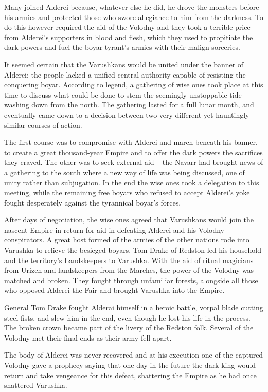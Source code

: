 Many joined Alderei because, whatever else he did, he drove the monsters before his armies and protected those who swore allegiance to him from the darkness. To do this however required the aid of the Volodny and they took a terrible price from Alderei’s supporters in blood and flesh, which they used to propitiate the dark powers and fuel the boyar tyrant's armies with their malign sorceries.

It seemed certain that the Varushkans would be united under the banner of Alderei; the people lacked a unified central authority capable of resisting the conquering boyar. According to legend, a gathering of wise ones took place at this time to discuss what could be done to stem the seemingly unstoppable tide washing down from the north. The gathering lasted for a full lunar month, and eventually came down to a decision between two very different yet hauntingly similar courses of action.

The first course was to compromise with Alderei and march beneath his banner, to create a great thousand-year Empire and to offer the dark powers the sacrifices they craved. The other was to seek external aid – the Navarr had brought news of a gathering to the south where a new way of life was being discussed, one of unity rather than subjugation. In the end the wise ones took a delegation to this meeting, while the remaining free boyars who refused to accept Alderei’s yoke fought desperately against the tyrannical boyar's forces.

After days of negotiation, the wise ones agreed that Varushkans would join the nascent Empire in return for aid in defeating Alderei and his Volodny conspirators. A great host formed of the armies of the other nations rode into Varushka to relieve the besieged boyars. Tom Drake of Redston led his household and the territory's Landskeepers to Varushka. With the aid of ritual magicians from Urizen and landskeepers from the Marches, the power of the Volodny was matched and broken. They fought through unfamiliar forests, alongside all those who opposed Alderei the Fair and brought Varushka into the Empire.

General Tom Drake fought Alderai himself in a heroic battle, vorpal blade cutting steel fists, and slew him in the end, even though he lost his life in the process. The broken crown became part of the livery of the Redston folk. Several of the Volodny met their final ends as their army fell apart.

The body of Alderei was never recovered and at his execution one of the captured Volodny gave a prophecy saying that one day in the future the dark king would return and take vengeance for this defeat, shattering the Empire as he had once shattered Varushka.

